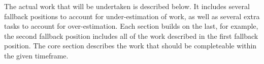 The actual work that will be undertaken is described below. It includes several fallback positions to account for under-estimation of work, as well as several extra tasks to account for over-estimation. Each section builds on the last, for example, the second fallback position includes all of the work described in the first fallback position. The core section describes the work that should be completeable within the given timeframe.
